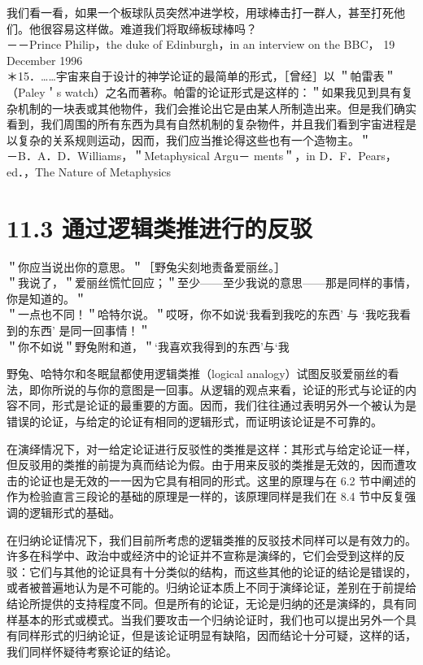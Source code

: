 我们看一看，如果一个板球队员突然冲进学校，用球棒击打一群人，甚至打死他们。他很容易这样做。难道我们将取缔板球棒吗？\\
－－Prince Philip，the duke of Edinburgh，in an interview on the BBC， 19 December 1996\\
＊15．……宇宙来自于设计的神学论证的最简单的形式，［曾经］以 ＂帕雷表＂（Paley＇s watch）之名而著称。帕雷的论证形式是这样的：＂如果我见到具有复杂机制的一块表或其他物件，我们会推论出它是由某人所制造出来。但是我们确实看到，我们周围的所有东西为具有自然机制的复杂物件，并且我们看到宇宙进程是以复杂的关系规则运动，因而，我们应当推论得这些也有一个造物主。＂\\
－B．A．D．Williams，＂Metaphysical Argu－ ments＂，in D．F．Pears，ed．，The Nature of Metaphysics

\section*{11.3 通过逻辑类推进行的反驳}
＂你应当说出你的意思。＂［野兔尖刻地责备爱丽丝。］\\
＂我说了，＂爱丽丝慌忙回应；＂至少——至少我说的意思——那是同样的事情，你是知道的。＂\\
＂一点也不同！＂哈特尔说。＂哎呀，你不如说‘我看到我吃的东西’ 与 ‘我吃我看到的东西’ 是同一回事情！＂\\
＂你不如说＂野兔附和道，＂‘我喜欢我得到的东西’与‘我

野兔、哈特尔和冬眠鼠都使用逻辑类推（logical analogy）试图反驳爱丽丝的看法，即你所说的与你的意图是一回事。从逻辑的观点来看，论证的形式与论证的内容不同，形式是论证的最重要的方面。因而，我们往往通过表明另外一个被认为是错误的论证，与给定的论证有相同的逻辑形式，而证明该论证是不可靠的。

在演绎情况下，对一给定论证进行反驳性的类推是这样：其形式与给定论证一样，但反驳用的类推的前提为真而结论为假。由于用来反驳的类推是无效的，因而遭攻击的论证也是无效的一一因为它具有相同的形式。这里的原理与在 6.2 节中阐述的作为检验直言三段论的基础的原理是一样的，该原理同样是我们在 8.4 节中反复强调的逻辑形式的基础。

在归纳论证情况下，我们目前所考虑的逻辑类推的反驳技术同样可以是有效力的。许多在科学中、政治中或经济中的论证并不宣称是演绎的，它们会受到这样的反驳：它们与其他的论证具有十分类似的结构，而这些其他的论证的结论是错误的，或者被普遍地认为是不可能的。归纳论证本质上不同于演绎论证，差别在于前提给结论所提供的支持程度不同。但是所有的论证，无论是归纳的还是演绎的，具有同样基本的形式或模式。当我们要攻击一个归纳论证时，我们也可以提出另外一个具有同样形式的归纳论证，但是该论证明显有缺陷，因而结论十分可疑，这样的话，我们同样怀疑待考察论证的结论。

